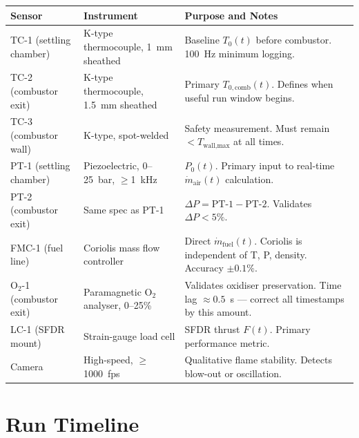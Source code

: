 \documentclass[12pt,a4paper]{report}
\begin{document}
\begin{center}
\renewcommand{\arraystretch}{1.4}
\begin{tabularx}{\linewidth}{@{}llX@{}}
  \toprule
  \textbf{Sensor} & \textbf{Instrument} & \textbf{Purpose and Notes}\\
  \midrule
  TC-1 (settling chamber)
    & K-type thermocouple, 1~mm sheathed
    & Baseline $T_0(t)$ before combustor. 100~Hz minimum logging.\\
  TC-2 (combustor exit)
    & K-type thermocouple, 1.5~mm sheathed
    & Primary $T_{0,\text{comb}}(t)$. Defines when useful run window begins.\\
  TC-3 (combustor wall)
    & K-type, spot-welded
    & Safety measurement. Must remain $<T_\text{wall,max}$ at all times.\\
  PT-1 (settling chamber)
    & Piezoelectric, 0--25~bar, $\geq$1~kHz
    & $P_0(t)$. Primary input to real-time $\dot{m}_\text{air}(t)$ calculation.\\
  PT-2 (combustor exit)
    & Same spec as PT-1
    & $\Delta P = \text{PT-1} - \text{PT-2}$. Validates $\Delta P < 5\%$.\\
  FMC-1 (fuel line)
    & Coriolis mass flow controller
    & Direct $\dot{m}_\text{fuel}(t)$. Coriolis is independent of T, P, density.
      Accuracy $\pm 0.1\%$.\\
  O$_2$-1 (combustor exit)
    & Paramagnetic O$_2$ analyser, 0--25\%
    & Validates oxidiser preservation. Time lag $\approx 0.5$~s — correct all
      timestamps by this amount.\\
  LC-1 (SFDR mount)
    & Strain-gauge load cell
    & SFDR thrust $F(t)$. Primary performance metric.\\
  Camera
    & High-speed, $\geq$1000~fps
    & Qualitative flame stability.  Detects blow-out or oscillation.\\
  \bottomrule
\end{tabularx}
\end{center}

\section{Run Timeline}
\end{document}
